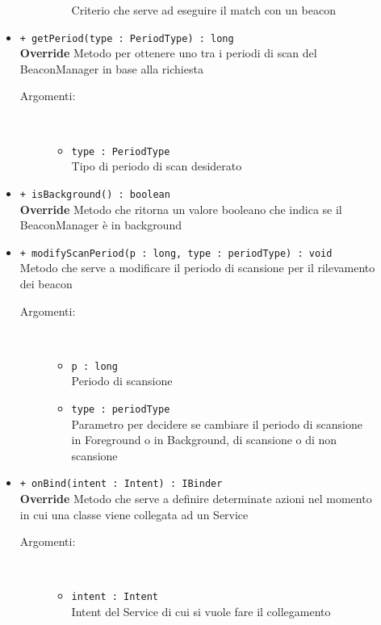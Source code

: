 \documentclass[../DefinizioneDiProdotto.tex]{subfiles}
\begin{document}
\begin{description}
\begin{itemize}
\begin{description}
\begin{itemize}
				Criterio che serve ad eseguire il match con un beacon\end{itemize}
		\end{description}
		\item \texttt{+ getPeriod(type : PeriodType) : long}\\
		\textbf{Override} Metodo per ottenere uno tra i periodi di scan del BeaconManager in base alla richiesta
		\begin{description}
			\item[Argomenti:] \
			\begin{itemize}
				\item \texttt{type : PeriodType}\\
				Tipo di periodo di scan desiderato\end{itemize}
		\end{description}
		\item \texttt{+ isBackground() : boolean}\\
		\textbf{Override} Metodo che ritorna un valore booleano che indica se il BeaconManager è in background
		\item \texttt{+ modifyScanPeriod(p : long, type : periodType) : void}\\
		Metodo che serve a modificare il periodo di scansione per il rilevamento dei beacon
		\begin{description}
			\item[Argomenti:] \
			\begin{itemize}
				\item \texttt{p : long}\\
				Periodo di scansione\item \texttt{type : periodType}\\
				Parametro per decidere se cambiare il periodo di scansione in Foreground o in Background, di scansione o di non scansione\end{itemize}
		\end{description}
		\item \texttt{+ onBind(intent : Intent) : IBinder}\\
		\textbf{Override} Metodo che serve a definire determinate azioni nel momento in cui una classe viene collegata ad un Service 
		\begin{description}
			\item[Argomenti:] \
			\begin{itemize}
				\item \texttt{intent : Intent}\\
				Intent del Service di cui  si vuole fare il collegamento  \end{itemize}

\end{description}
\end{itemize}
\end{description}
\end{document}
